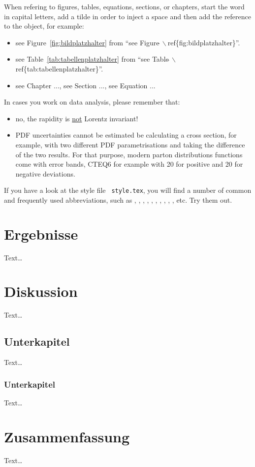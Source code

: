 \documentclass[bachelor,       %
               twoside,        %
               BCOR10mm,       %
               ngerman,english  %
               ]{GAUBM}
\begin{document}
When refering to figures, tables, equations, sections, or chapters,
start the word in capital letters, add a tilde in order to inject a
space and then add the reference to the object, for example:
\begin{itemize}
  \item see Figure~\ref{fig:bildplatzhalter} from ``see
    Figure$\tilde{\ }\backslash$ref\{fig:bildplatzhalter\}''.
  \item see Table~\ref{tab:tabellenplatzhalter} from ``see
    Table$\tilde{\ }\backslash$ref\{tab:tabellenplatzhalter\}''.
  \item see Chapter ..., see Section ..., see Equation ...
\end{itemize}

In cases you work on data analysis, please remember that:
\begin{itemize}
\item no, the rapidity is {\underline{not}} Lorentz invariant!
\item PDF uncertainties cannot be estimated be calculating a cross
  section, for example, with two different PDF parametrisations and
  taking the difference of the two results. For that purpose, modern
  parton distributions functions come with error bands, CTEQ6 for
  example with 20 for positive and 20 for negative deviations.
\end{itemize}

If you have a look at the style file \texttt{ style.tex}, you will find a
number of common and frequently used abbreviations, such as \dzero,
\cdf, \ttbar, \ljets, \mujets, \tevatron, \cern, \pythia, \herwig, \geant, \met
etc. Try them out.


\chapter{Ergebnisse}
Text\dots
\chapter{Diskussion}
Text\dots
\section{Unterkapitel}
Text\dots
\subsection{Unterkapitel}
Text\dots
\chapter{Zusammenfassung}
Text\dots
\end{document}
